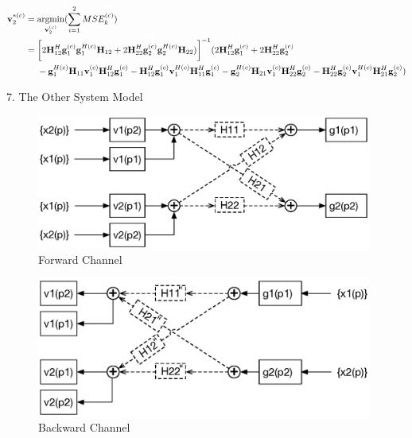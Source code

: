 \documentclass[11pt, oneside]{article}   	%
\begin{document}
\begin{align*}
\textbf{v}^{*(c)}_{2} 	&= \operatornamewithlimits{argmin}_{\textbf{v}^{(c)}_{2}}	(\displaystyle\sum_{i=1}^{2}	MSE^{(c)}_{k})	\\
				   &= 	\bigg[ 2	\textbf{H}^{H}_{12}	\textbf{g}^{(c)}_{1}	\textbf{g}^{H(c)}_{1}		\textbf{H}_{12}
				   +	2	\textbf{H}^{H}_{22}	\textbf{g}^{(c)}_{2}	\textbf{g}^{H(c)}_{2}		\textbf{H}_{22})
				   \bigg]^{-1} 
				   (2	\textbf{H}^{H}_{12}	\textbf{g}^{(c)}_{1}	+	2	\textbf{H}^{H}_{22}	\textbf{g}^{(c)}_{2}	\\
				   &\ \ \ \ -	\textbf{g}^{H(c)}_{1}	\textbf{H}_{11}	\textbf{v}^{(c)}_{1} 	\textbf{H}^{H}_{12}	\textbf{g}^{(c)}_{1}
				   -	\textbf{H}^{H}_{12}	\textbf{g}^{(c)}_{1}	\textbf{v}^{H(c)}_{1}	\textbf{H}^{H}_{11}	\textbf{g}^{(c)}_{1}
				   -	\textbf{g}^{H(c)}_{2}	\textbf{H}_{21}	\textbf{v}^{(c)}_{1} 	\textbf{H}^{H}_{22}	\textbf{g}^{(c)}_{2}
				   -	\textbf{H}^{H}_{22}	\textbf{g}^{(c)}_{2}	\textbf{v}^{H(c)}_{1}	\textbf{H}^{H}_{21}	\textbf{g}^{(c)}_{2}
				   )
\end{align*}












\newpage

7. The Other System Model

 \begin{figure}[h]
    \centering
    \centerline{\includegraphics[width=110mm]{forward_channel_2}}
    \caption{Forward Channel}
\end{figure} 

\begin{figure}[h]
    \centering
    \centerline{\includegraphics[width=110mm]{backward_channel_2}}
    \caption{Backward Channel}
\end{figure} 
\end{document}
